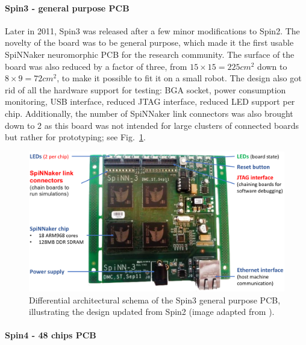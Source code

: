 \newpage
\vspace*{-1.2cm}
\paragraph{Spin3 - general purpose PCB}

Later in 2011, Spin3 was released after a few minor modifications to Spin2. The novelty of the board was to be general purpose, which made it the first usable SpiNNaker neuromorphic PCB for the research community. The surface of the board was also reduced by a factor of three, from $15 \times 15 = 225cm^2$ down to $8 \times 9 = 72cm^2$, to make it possible to fit it on a small robot. The design also got rid of all the hardware support for testing: BGA socket, power consumption monitoring, USB interface, reduced JTAG interface, reduced LED support per chip. Additionally, the number of SpiNNaker link connectors was also brought down to 2 as this board was not intended for large clusters of connected boards but rather for prototyping; see Fig.~\ref{fig:spin3}.


\begin{figure}[!ht]
\centering
\includegraphics[width=\textwidth]{figures/spin3-schema.png}
\caption{Differential architectural schema of the Spin3 general purpose PCB, illustrating the design updated from Spin2 (image adapted from \cite{dev-process}).}
\label{fig:spin3}
\end{figure} 


\newpage
\paragraph{Spin4 - 48 chips PCB}

